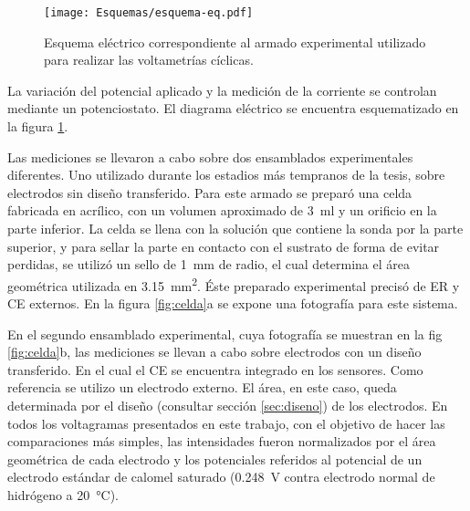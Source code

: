 					\begin{figure}[h!]
			 		  \begin{center}
			 		  \texttt{[image: Esquemas/esquema-eq.pdf]}
			 		  \caption[Circuito eléctrico EQ]{Esquema eléctrico correspondiente al armado experimental utilizado para realizar las voltametrías cíclicas.}
			 		  \label{fig:eq-circuito}
			 		  \end{center}
			 		  \end{figure}

			\pagebreak

			La variación del potencial aplicado y la medición de la corriente se controlan mediante un potenciostato. El diagrama eléctrico se encuentra esquematizado en la figura \ref{fig:eq-circuito}.

			Las mediciones se llevaron a cabo sobre dos ensamblados experimentales diferentes. Uno utilizado durante los estadios más tempranos de la tesis, sobre electrodos sin diseño transferido. Para este armado se preparó una celda fabricada en acrílico, con un volumen aproximado de \SI{3}{\ml} y un orificio en la parte inferior. La celda se llena con la solución que contiene la sonda por la parte superior, y para sellar la parte en contacto con el sustrato de forma de evitar perdidas, se utilizó un sello de \SI{1}{\mm} de radio, el cual determina el área geométrica utilizada en \SI{3.15}{\mm^{2}}. Éste preparado experimental precisó de ER y CE externos. En la figura \ref{fig:celda}a se expone una fotografía para este sistema. 

             En el segundo ensamblado experimental, cuya fotografía se muestran en la fig \ref{fig:celda}b, las mediciones se llevan a cabo sobre electrodos con un diseño transferido. En el cual el CE se encuentra integrado en los sensores. Como referencia se utilizo un electrodo externo. El área, en este caso, queda determinada por el diseño (consultar sección \ref{sec:diseno}) de los electrodos. En todos los voltagramas presentados en este trabajo, con el objetivo de hacer las comparaciones más simples, las intensidades fueron normalizados por el área geométrica de cada electrodo y los potenciales referidos al potencial de un electrodo estándar de calomel saturado (\SI{0.248}{\volt} contra electrodo normal de hidrógeno a \SI{20}{\celsius})\cite{BANUS1941}.


